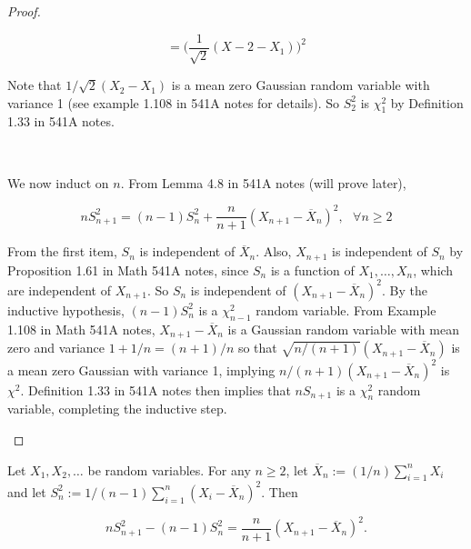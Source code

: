 \begin{proof}
\begin{enumerate}[(i)]
\[
= \bigg( \frac{1}{\sqrt{2}} (X-2 - X_1) \bigg)^2
\]

Note that \(1/\sqrt{2} (X_2 - X_1)\) is a mean zero Gaussian random variable with variance 1 (see example 1.108 in 541A notes for details). So \(S_2^2\) is \(\chi_1^2\) by Definition 1.33 in 541A notes.

\

We now induct on \(n\). From Lemma 4.8 in 541A notes (will prove later),

\[
n S_{n+1}^2 = (n-1) S_n^2 + \frac{n}{n+1}(X_{n+1} - \overline{X}_n)^2, \ \ \ \forall n \geq 2
\]

From the first item, \(S_n\) is independent of \(\overline{X}_n\). Also, \(X_{n+1}\) is independent of \(S_n\) by Proposition 1.61 in Math 541A notes, since \(S_n\) is a function of \(X_1, \ldots, X_n\), which are independent of \(X_{n+1}\). So \(S_n\) is independent of \((X_{n+1} - \overline{X}_n)^2\). By the inductive hypothesis, \((n-1)S_n^2\) is a \(\chi_{n-1}^2\) random variable. From Example 1.108 in Math 541A notes, \(X_{n+1} - \overline{X}_n\) is a Gaussian random variable with mean zero and variance \(1 + 1/n = (n+1)/n\) so that \(\sqrt{n/(n+1)} (X_{n+1} - \overline{X}_n)\) is a mean zero Gaussian with variance 1, implying \(n/(n+1) (X_{n+1} - \overline{X}_n)^2\) is \(\chi^2\). Definition 1.33 in 541A notes then implies that \(nS_{n+1}\) is a \(\chi_n^2\) random variable, completing the inductive step.

\end{enumerate}

\end{proof}

\begin{lemma}

\end{lemma} Let \(X_1, X_2, \ldots\) be random variables. For any \(n \geq 2\), let \(\overline{X}_n:= (1/n)\sum_{i=1}^n X_i\) and let \(S_n^2:= 1/(n-1) \sum_{i=1}^n (X_i - \overline{X}_n)^2\). Then

\[
n S_{n+1}^2  - (n-1)S_n^2 =\frac{n}{n+1}(X_{n+1} - \overline{X}_n)^2.
\]

